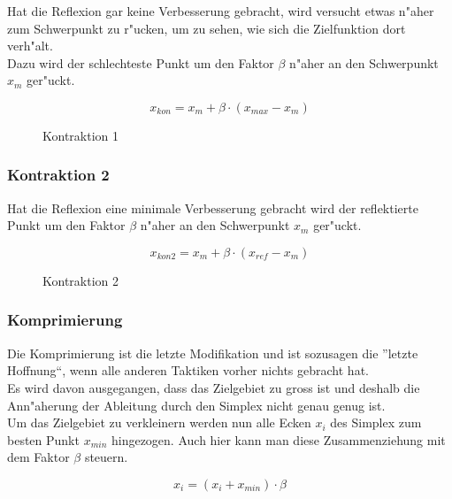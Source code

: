 Hat die Reflexion gar keine Verbesserung gebracht, wird versucht etwas n"aher zum Schwerpunkt zu r"ucken, um zu sehen, wie sich die Zielfunktion dort verh"alt.\\
Dazu wird der schlechteste Punkt um den Faktor $\beta$ n"aher an den Schwerpunkt $x_m$ ger"uckt. 

\begin{equation}
x_{kon} = x_{m} + \beta \cdot (x_{max}-x_{m})
\end{equation}

\begin{figure}[h]
	\centering
  	\caption{Kontraktion 1}%
	\label{fig:Kon1}%
\end{figure}

\subsubsection{Kontraktion 2}

Hat die Reflexion eine minimale Verbesserung gebracht wird der reflektierte Punkt um den Faktor $\beta$ n"aher an den Schwerpunkt $x_m$ ger"uckt. 

\begin{equation}
x_{kon2} = x_{m} + \beta \cdot (x_{ref}-x_{m})
\end{equation}

\begin{figure}[h]
	\centering
  	\caption{Kontraktion 2}%
	\label{fig:Kon2}%
\end{figure}

\subsubsection{Komprimierung}
Die Komprimierung ist die letzte Modifikation und ist sozusagen die ''letzte Hoffnung``, wenn alle anderen Taktiken vorher nichts gebracht hat.\\
Es wird davon ausgegangen, dass das Zielgebiet zu gross ist und deshalb die Ann"aherung der Ableitung durch den Simplex nicht genau genug ist.\\
Um das Zielgebiet zu verkleinern werden nun alle Ecken $x_i$ des Simplex zum besten Punkt $x_{min}$ hingezogen. Auch hier kann man diese Zusammenziehung mit dem Faktor $\beta$ steuern.  

\begin{equation}
x_{i} = (x_i + x_{min}) \cdot \beta
\end{equation}

